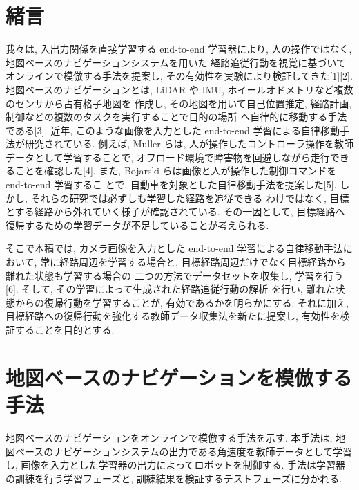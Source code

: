 \documentclass{jarticle}
\begin{document}
\date{} 

\maketitle
\thispagestyle{empty}
\pagestyle{empty}

\small

\section{緒言}
我々は, 入出力関係を直接学習する end-to-end 学習器により,
人の操作ではなく, 地図ベースのナビゲーションシステムを用いた
経路追従行動を視覚に基づいてオンラインで模倣する手法を提案し,
その有効性を実験により検証してきた[1][2].
地図ベースのナビゲーションとは, LiDAR や IMU, ホイールオドメトリなど複数のセンサから占有格子地図を
作成し, その地図を用いて自己位置推定, 経路計画, 制御などの複数のタスクを実行することで目的の場所
へ自律的に移動する手法である[3].
近年, このような画像を入力とした end-to-end 学習による自律移動手法が研究されている.
例えば, Muller らは, 人が操作したコントローラ操作を教師データとして学習することで, 
オフロード環境で障害物を回避しながら走行できることを確認した[4].
また, Bojarski らは画像と人が操作した制御コマンドを end-to-end 学習するこ
とで, 自動車を対象とした自律移動手法を提案した[5].
しかし, それらの研究では必ずしも学習した経路を追従できる
わけではなく, 目標とする経路から外れていく様子が確認されている.
その一因として, 目標経路へ復帰するための学習データが不足していることが考えられる.

そこで本稿では, カメラ画像を入力とした end-to-end 学習による自律移動手法において,
常に経路周辺を学習する場合と, 目標経路周辺だけでなく目標経路から離れた状態も学習する場合の
二つの方法でデータセットを収集し, 学習を行う[6]. そして, その学習によって生成された経路追従行動の解析
を行い, 離れた状態からの復帰行動を学習することが, 有効であるかを明らかにする. それに加え, 
目標経路への復帰行動を強化する教師データ収集法を新たに提案し, 有効性を検証することを目的とする.

 
\section{地図ベースのナビゲーションを模倣する手法}
地図ベースのナビゲーションをオンラインで模倣する手法を示す.
本手法は, 地図ベースのナビゲーションシステムの出力である角速度を教師データとして学習し, 
画像を入力とした学習器の出力によってロボットを制御する. 
手法は学習器の訓練を行う学習フェーズと, 訓練結果を検証するテストフェーズに分かれる.
\end{document}
